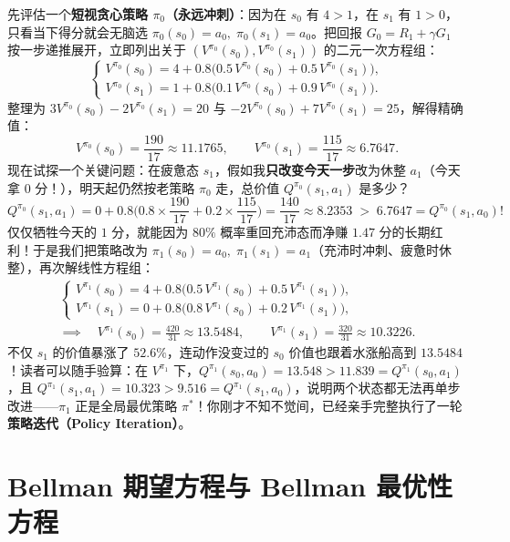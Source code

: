 先评估一个\textbf{短视贪心策略 $\pi_0$（永远冲刺）}：因为在 $s_0$ 有 $4>1$，在 $s_1$ 有 $1>0$，只看当下得分就会无脑选 $\pi_0(s_0)=a_0,\; \pi_0(s_1)=a_0$。把回报 $G_0 = R_1 + \gamma G_1$ 按一步递推展开，立即列出关于 $(V^{\pi_0}(s_0), V^{\pi_0}(s_1))$ 的二元一次方程组：
\[
  \begin{cases}
    V^{\pi_0}(s_0) = 4 + 0.8\big(0.5\, V^{\pi_0}(s_0) + 0.5\, V^{\pi_0}(s_1)\big), \\
    V^{\pi_0}(s_1) = 1 + 0.8\big(0.1\, V^{\pi_0}(s_0) + 0.9\, V^{\pi_0}(s_1)\big).
  \end{cases}
\]
整理为 $3 V^{\pi_0}(s_0) - 2 V^{\pi_0}(s_1) = 20$ 与 $-2 V^{\pi_0}(s_0) + 7 V^{\pi_0}(s_1) = 25$，解得精确值：
\[
  V^{\pi_0}(s_0) = \frac{190}{17} \approx 11.1765, \qquad
  V^{\pi_0}(s_1) = \frac{115}{17} \approx 6.7647.
\]
现在试探一个关键问题：在疲惫态 $s_1$，假如我\textbf{只改变今天一步}改为休整 $a_1$（今天拿 $0$ 分！），明天起仍然按老策略 $\pi_0$ 走，总价值 $Q^{\pi_0}(s_1, a_1)$ 是多少？
\[
  Q^{\pi_0}(s_1, a_1) = 0 + 0.8\Big(0.8 \times \frac{190}{17} + 0.2 \times \frac{115}{17}\Big)
  = \frac{140}{17} \approx \mathbf{8.2353} \;>\; 6.7647 = Q^{\pi_0}(s_1, a_0)!
\]
仅仅牺牲今天的 $1$ 分，就能因为 $80\%$ 概率重回充沛态而净赚 $1.47$ 分的长期红利！于是我们把策略改为 $\pi_1(s_0)=a_0,\; \pi_1(s_1)=a_1$（充沛时冲刺、疲惫时休整），再次解线性方程组：
\begin{gather*}
  \begin{cases}
    V^{\pi_1}(s_0) = 4 + 0.8\big(0.5\, V^{\pi_1}(s_0) + 0.5\, V^{\pi_1}(s_1)\big), \\
    V^{\pi_1}(s_1) = 0 + 0.8\big(0.8\, V^{\pi_1}(s_0) + 0.2\, V^{\pi_1}(s_1)\big),
  \end{cases} \\
  \implies\quad
  V^{\pi_1}(s_0) = \frac{420}{31} \approx \mathbf{13.5484}, \qquad
  V^{\pi_1}(s_1) = \frac{320}{31} \approx \mathbf{10.3226}.
\end{gather*}
不仅 $s_1$ 的价值暴涨了 $52.6\%$，连动作没变过的 $s_0$ 价值也跟着水涨船高到 $13.5484$！读者可以随手验算：在 $V^{\pi_1}$ 下，$Q^{\pi_1}(s_0, a_0)=13.548 > 11.839=Q^{\pi_1}(s_0, a_1)$，且 $Q^{\pi_1}(s_1, a_1)=10.323 > 9.516=Q^{\pi_1}(s_1, a_0)$，说明两个状态都无法再单步改进——$\pi_1$ 正是全局最优策略 $\pi^*$！你刚才不知不觉间，已经亲手完整执行了一轮\textbf{策略迭代（Policy Iteration）}。

\section{Bellman 期望方程与 Bellman 最优性方程}\label{sec:bellman}

